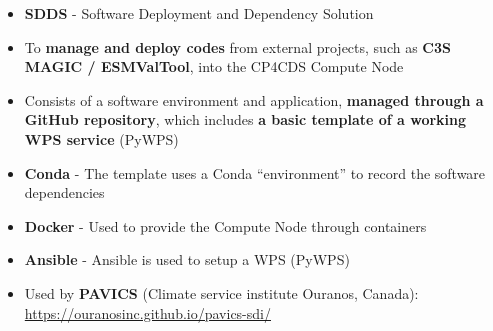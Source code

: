 \documentclass[landscape,a0paper,fontscale=0.4]{baposter} %
\newcommand{\compresslist}{%
\setlength{\itemsep}{1pt}%
\setlength{\parskip}{0pt}%
\setlength{\parsep}{0pt}%
}
\begin{document}
\begin{poster}
{    %
    \begin{itemize}\compresslist
      \item {\bf SDDS} - Software Deployment and Dependency Solution
      \item To {\bf manage and deploy codes} from external projects,
        such as {\bf C3S MAGIC / ESMValTool}, into the CP4CDS Compute Node
      \item Consists of a software environment and application, {\bf managed through a GitHub repository},
        which includes {\bf a basic template of a working WPS service} (PyWPS)
      \item {\bf Conda} -  The template uses a Conda ``environment'' to record the software dependencies
      \item {\bf Docker} - Used to provide the Compute Node through containers
      \item {\bf Ansible} - Ansible is used to setup a WPS (PyWPS) %
      \item Used by {\bf PAVICS} (Climate service institute Ouranos, Canada):\\
        \url{https://ouranosinc.github.io/pavics-sdi/}
    \end{itemize}

}


\end{poster}
\end{document}
